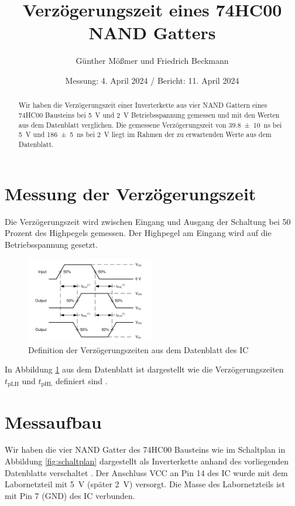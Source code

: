 \documentclass[paper=a4,oneside,abstract,DIV=19,parskip=half]{scrartcl}
\title{Verzögerungszeit eines 74HC00 NAND Gatters}
\author{Günther Mößmer und Friedrich Beckmann}
\date{Messung: 4. April 2024 / Bericht: 11. April 2024}
\begin{document}
\maketitle
\begin{abstract}
\noindent Wir haben die Verzögerungszeit einer Inverterkette aus vier NAND Gattern eines 74HC00 Bausteins bei \SI{5}{\V} und \SI{2}{\V}  Betriebsspannung gemessen und mit den Werten aus dem Datenblatt verglichen. Die gemessene Verzögerungszeit von \qty{39,8(10)}{\ns} bei \SI{5}{\V} und \qty{186(5)}{\ns} bei \SI{2}{\V}  liegt im Rahmen der zu erwartenden Werte aus dem Datenblatt.
\end{abstract}

\section{Messung der Verzögerungszeit}
Die Verzögerungszeit wird zwischen Eingang und Ausgang der Schaltung bei 50 Prozent des Highpegels gemessen. Der Highpegel am Eingang wird auf die Betriebsspannung gesetzt. 
\begin{figure}[!htb]
\begin{center}
\includegraphics[width=0.5\textwidth]{messprinzip}
\end{center}
\caption{Definition der Verzögerungszeiten aus dem Datenblatt des IC \cite[Figure 7-2]{ti74hc00}}
\label{fig:messprinzip}
\end{figure}
In Abbildung \ref{fig:messprinzip} aus dem Datenblatt ist dargestellt wie die Verzögerungszeiten $t_{\textrm{pLH}}$ und $t_{\textrm{pHL}}$ definiert sind \cite[Figure 7-2]{ti74hc00}.

\section{Messaufbau}

Wir haben die vier NAND Gatter des 74HC00 Bausteins wie im Schaltplan in Abbildung \ref{fig:schaltplan} dargestellt als Inverterkette anhand des vorliegenden Datenblatts verschaltet \cite{ti74hc00}. Der Anschluss VCC an Pin 14 des IC wurde mit dem Labornetzteil mit \SI{+5}{\V} (später \SI{2}{\V}) versorgt. Die Masse des Labornetzteils ist mit Pin 7 (GND) des IC verbunden.
\end{document}
